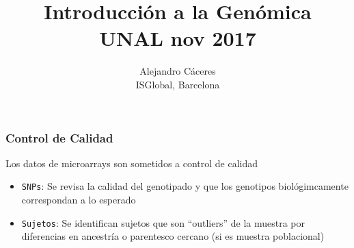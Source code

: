 \documentclass{beamer}\usepackage[]{graphicx}\usepackage[]{color}
\begin{document}
\title{Introducci\'on a la Gen\'omica \\ UNAL nov 2017}
\author{Alejandro C\'aceres \\ ISGlobal, Barcelona}


\maketitle


\begin{frame}[fragile]
\frametitle{Control de Calidad}
Los datos de microarrays son sometidos a control de calidad
\begin{itemize}

\item {\tt SNPs}: Se revisa la calidad del genotipado y que los genotipos biol\'ogimcamente correspondan a lo esperado 

\item {\tt Sujetos}: Se identifican sujetos que son ``outliers'' de la muestra por diferencias en ancestr\'ia o parentesco cercano (si es muestra poblacional) 

\end{itemize}
\end{frame}
\end{document}
